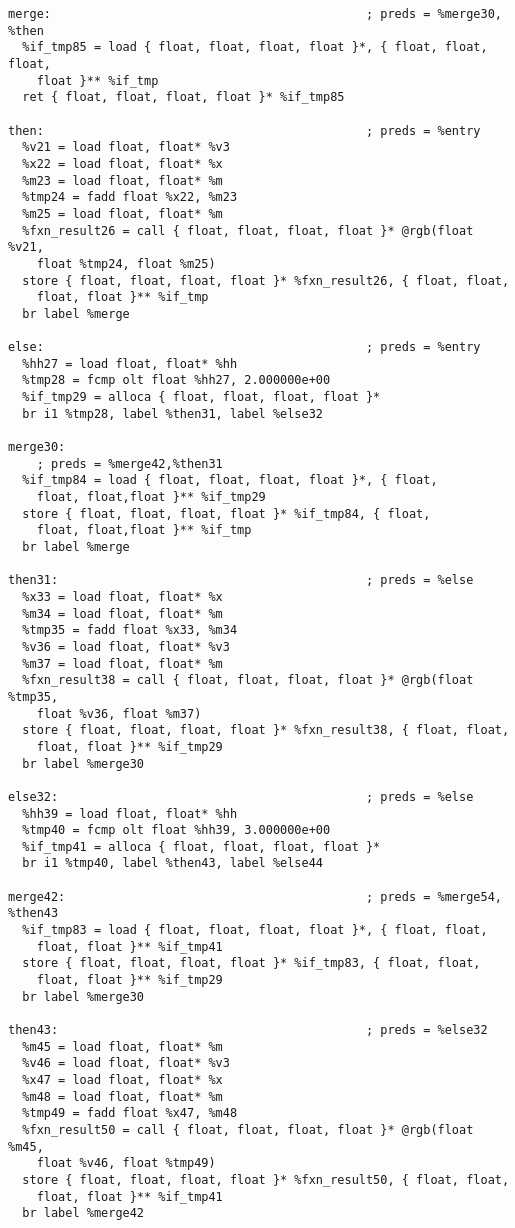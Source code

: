 \documentclass[main.tex]{subfiles}
\begin{document}
{\begin{lstlisting}
merge:                                            ; preds = %merge30, %then
  %if_tmp85 = load { float, float, float, float }*, { float, float, float, 
    float }** %if_tmp
  ret { float, float, float, float }* %if_tmp85

then:                                             ; preds = %entry
  %v21 = load float, float* %v3
  %x22 = load float, float* %x
  %m23 = load float, float* %m
  %tmp24 = fadd float %x22, %m23
  %m25 = load float, float* %m
  %fxn_result26 = call { float, float, float, float }* @rgb(float %v21,
    float %tmp24, float %m25)
  store { float, float, float, float }* %fxn_result26, { float, float,
    float, float }** %if_tmp
  br label %merge

else:                                             ; preds = %entry
  %hh27 = load float, float* %hh
  %tmp28 = fcmp olt float %hh27, 2.000000e+00
  %if_tmp29 = alloca { float, float, float, float }*
  br i1 %tmp28, label %then31, label %else32

merge30:                                          
    ; preds = %merge42,%then31
  %if_tmp84 = load { float, float, float, float }*, { float,
    float, float,float }** %if_tmp29
  store { float, float, float, float }* %if_tmp84, { float,
    float, float,float }** %if_tmp
  br label %merge

then31:                                           ; preds = %else
  %x33 = load float, float* %x
  %m34 = load float, float* %m
  %tmp35 = fadd float %x33, %m34
  %v36 = load float, float* %v3
  %m37 = load float, float* %m
  %fxn_result38 = call { float, float, float, float }* @rgb(float %tmp35,
    float %v36, float %m37)
  store { float, float, float, float }* %fxn_result38, { float, float,
    float, float }** %if_tmp29
  br label %merge30

else32:                                           ; preds = %else
  %hh39 = load float, float* %hh
  %tmp40 = fcmp olt float %hh39, 3.000000e+00
  %if_tmp41 = alloca { float, float, float, float }*
  br i1 %tmp40, label %then43, label %else44

merge42:                                          ; preds = %merge54, %then43
  %if_tmp83 = load { float, float, float, float }*, { float, float,
    float, float }** %if_tmp41
  store { float, float, float, float }* %if_tmp83, { float, float,
    float, float }** %if_tmp29
  br label %merge30

then43:                                           ; preds = %else32
  %m45 = load float, float* %m
  %v46 = load float, float* %v3
  %x47 = load float, float* %x
  %m48 = load float, float* %m
  %tmp49 = fadd float %x47, %m48
  %fxn_result50 = call { float, float, float, float }* @rgb(float %m45,
    float %v46, float %tmp49)
  store { float, float, float, float }* %fxn_result50, { float, float,
    float, float }** %if_tmp41
  br label %merge42


\end{lstlisting}}
\end{document}
